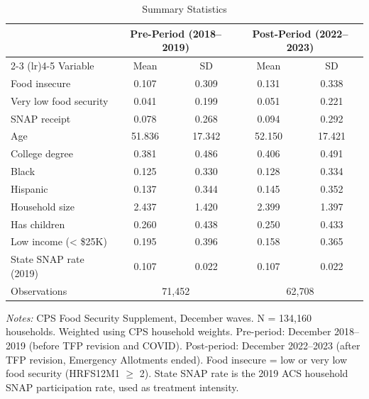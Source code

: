 \begin{table}[H]
\centering
\caption{Summary Statistics}
\label{tab:summary}
\begin{threeparttable}
\begin{tabular}{lcccc}
\toprule
& \multicolumn{2}{c}{Pre-Period (2018--2019)} & \multicolumn{2}{c}{Post-Period (2022--2023)} \\
\cmidrule(lr){2-3} \cmidrule(lr){4-5}
Variable & Mean & SD & Mean & SD \\
\midrule
Food insecure & 0.107 & 0.309 & 0.131 & 0.338 \\
Very low food security & 0.041 & 0.199 & 0.051 & 0.221 \\
SNAP receipt & 0.078 & 0.268 & 0.094 & 0.292 \\
Age & 51.836 & 17.342 & 52.150 & 17.421 \\
College degree & 0.381 & 0.486 & 0.406 & 0.491 \\
Black & 0.125 & 0.330 & 0.128 & 0.334 \\
Hispanic & 0.137 & 0.344 & 0.145 & 0.352 \\
Household size & 2.437 & 1.420 & 2.399 & 1.397 \\
Has children & 0.260 & 0.438 & 0.250 & 0.433 \\
Low income (< \$25K) & 0.195 & 0.396 & 0.158 & 0.365 \\
State SNAP rate (2019) & 0.107 & 0.022 & 0.107 & 0.022 \\
\midrule
Observations & \multicolumn{2}{c}{71,452} & \multicolumn{2}{c}{62,708} \\
\bottomrule
\end{tabular}
\begin{tablenotes}[flushleft]
\small
\item \textit{Notes:} CPS Food Security Supplement, December waves. N = 134,160 households. Weighted using CPS household weights. Pre-period: December 2018--2019 (before TFP revision and COVID). Post-period: December 2022--2023 (after TFP revision, Emergency Allotments ended). Food insecure = low or very low food security (HRFS12M1 $\geq$ 2). State SNAP rate is the 2019 ACS household SNAP participation rate, used as treatment intensity.
\end{tablenotes}
\end{threeparttable}
\end{table}
